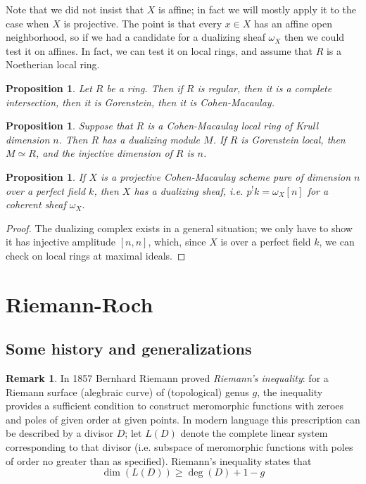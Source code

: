 \documentclass[10pt]{article}
\newtheorem{prop}[thm]{Proposition}
\theoremstyle{definition}
\newtheorem{rmk}[thm]{Remark}
\begin{document}
Note that we did not insist that $X$ is affine; in fact we will mostly apply it to the case when $X$ is projective.  The point is that every $x \in X$ has an affine open neighborhood, so if we had a candidate for a dualizing sheaf $\omega_X$ then we could test it on affines.  In fact, we can test it on local rings, and assume that $R$ is a Noetherian local ring.

\begin{prop}
Let $R$ be a ring.  Then if $R$ is regular, then it is a complete intersection, then it is Gorenstein, then it is Cohen-Macaulay.
\end{prop}


\begin{prop}
Suppose that $R$ is a Cohen-Macaulay local ring of Krull dimension $n$.  Then $R$ has a dualizing module $M$.  If $R$ is Gorenstein local, then $M \simeq R$, and the injective dimension of $R$ is $n$.
\end{prop}


\begin{prop}
If $X$ is a projective Cohen-Macaulay scheme pure of dimension $n$ over a perfect field $k$, then $X$ has a dualizing sheaf, i.e. $p^! k = \omega_X[n]$ for a coherent sheaf $\omega_X$.
\end{prop}
\begin{proof}
The dualizing complex exists in a general situation; we only have to show it has injective amplitude $[n, n]$, which, since $X$ is over a perfect field $k$, we can check on local rings at maximal ideals.
\end{proof}


\newpage


\section{Riemann-Roch}


\subsection{Some history and generalizations}

\begin{rmk}
In 1857 Bernhard Riemann proved \emph{Riemann's inequality}: for a Riemann surface (alegbraic curve) of (topological) genus $g$, the inequality provides a sufficient condition to construct meromorphic functions with zeroes and poles of given order at given points.  In modern language this prescription can be described by a divisor $D$; let $L(D)$ denote the complete linear system corresponding to that divisor (i.e. subspace of meromorphic functions with poles of order no greater than as specified).  Riemann's inequality states that
$$\dim(L(D)) \geq \deg(D) + 1 - g$$
\end{rmk}
\end{document}
